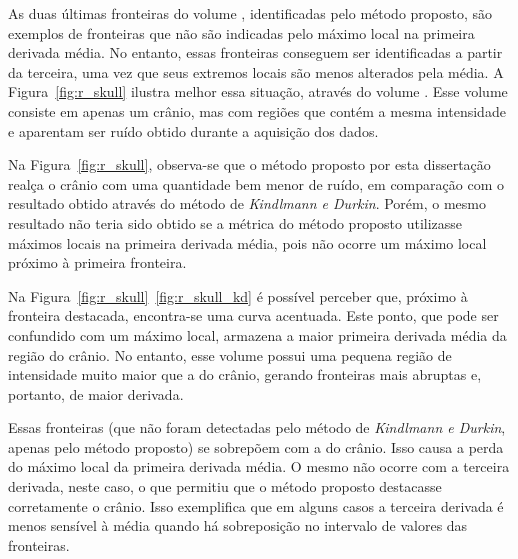 	As duas últimas fronteiras do volume , identificadas pelo método proposto, são exemplos de fronteiras que não são indicadas pelo máximo local na primeira derivada média. No entanto, essas fronteiras conseguem ser identificadas a partir da terceira, uma vez que seus extremos locais são menos alterados pela média.	A Figura~\ref{fig:r_skull} ilustra melhor essa situação, através do volume . Esse volume consiste em apenas um crânio, mas com regiões que contém a mesma intensidade e aparentam ser ruído obtido durante a aquisição dos dados.
	
	Na Figura~\ref{fig:r_skull}, observa-se que o método proposto por esta dissertação realça o crânio com uma quantidade bem menor de ruído, em comparação com o resultado obtido através do método de \textit{Kindlmann e Durkin}. Porém, o mesmo resultado não teria sido obtido se a métrica do método proposto utilizasse máximos locais na primeira derivada média, pois não ocorre um máximo local próximo à primeira fronteira.
	
	Na Figura~\ref{fig:r_skull}~\ref{fig:r_skull_kd} é possível perceber que, próximo à fronteira destacada, encontra-se uma curva acentuada. Este ponto, que pode ser confundido com um máximo local, armazena a maior primeira derivada média da região do crânio. No entanto, esse volume possui uma pequena região de intensidade muito maior que a do crânio, gerando fronteiras mais abruptas e, portanto, de maior derivada.
	
	Essas fronteiras (que não foram detectadas pelo método de \textit{Kindlmann e Durkin}, apenas pelo método proposto) se sobrepõem com a do crânio. Isso causa a perda do máximo local da primeira derivada média. O mesmo não ocorre com a terceira derivada, neste caso, o que permitiu que o método proposto destacasse corretamente o crânio. Isso exemplifica que em alguns casos a terceira derivada é menos sensível à média quando há sobreposição no intervalo de valores das fronteiras.
	

